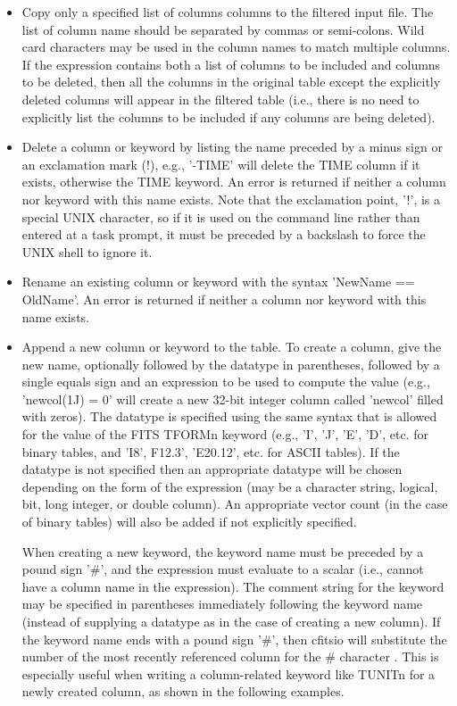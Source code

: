 \documentclass[11pt]{book}
\begin{document}
\begin{itemize}

\item
Copy only a specified list of columns columns to the filtered input file.
The list of column name should be separated by commas or semi-colons.  Wild card
characters may be used in the column names to match multiple columns.
If the expression contains both a list of columns to be included and
columns to be deleted, then all the columns in the original table
except the explicitly deleted columns will appear in the filtered
table (i.e., there is no need to explicitly list the columns to
be included if any columns are being deleted).

\item
Delete a column or keyword by listing the name preceded by a minus
sign or an exclamation mark (!), e.g., '-TIME' will delete the TIME
column if it exists, otherwise the TIME keyword.  An error is returned
if neither a column nor keyword with this name exists.  Note  that the
exclamation point,  '!', is a special UNIX character, so if it is used
on the command line rather than entered at a task prompt, it must be
preceded by a backslash to force the UNIX shell to ignore it.

\item
Rename an existing column or keyword with the syntax 'NewName ==
OldName'.  An error is returned if neither a column nor keyword with
this name exists.

\item
Append a new column or keyword to the table.  To create a column,
give the new name, optionally followed by the datatype in parentheses,
followed by a single equals sign and an  expression to be used to
compute the value (e.g., 'newcol(1J) = 0' will create a new 32-bit
integer column called 'newcol' filled with zeros).  The datatype is
specified using the same syntax that is allowed for the value of the
FITS TFORMn keyword (e.g., 'I', 'J', 'E', 'D', etc. for binary tables,
and 'I8', F12.3', 'E20.12', etc. for ASCII tables).  If the datatype is
not specified then an appropriate datatype will be chosen depending on
the form of the expression (may be a character string, logical, bit, long
integer, or double column). An appropriate vector count (in the case
of binary tables) will also be added if not explicitly specified.

When creating a new keyword, the keyword name must be preceded by a
pound sign '\#', and the expression must evaluate to a scalar
(i.e., cannot have a column name in the expression).  The comment
string for the keyword may be specified in parentheses immediately
following the keyword name (instead of supplying a datatype as in
the case of creating a new column).  If the keyword name ends with a
pound sign '\#', then cfitsio will substitute the number of the
most recently referenced column for the \# character .
This is especially useful when writing
a column-related keyword like TUNITn for a newly created column,
as shown in the following examples.


\end{itemize}
\end{document}
